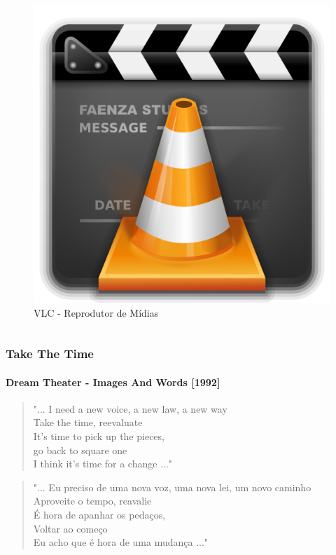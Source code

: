 \begin{frame}
\begin{columns}
	\begin{column}{4cm}
		\begin{figure}
			\includegraphics[scale=1.0]{img/vlc.png} 
			\caption{VLC - Reprodutor de Mídias}
		\end{figure}
	\end{column}
	
\end{columns}

\end{frame}

\begin{frame}\frametitle{Take The Time}\framesubtitle{Dream Theater - Images And Words [1992]}

\begin{quote}
"... I need a new {\Large voice}, a new {\Large law}, a {\LARGE new way}\\
Take the time, reevaluate\\
It's time to {\LARGE pick up the pieces},\\
go back to {\large square one}\\
I think it's {\huge time for a change} ..."
\end{quote}

\begin{quote}
"... Eu preciso de uma nova voz, uma nova lei, um novo caminho\\
Aproveite o tempo, reavalie\\
É hora de apanhar os pedaços,\\
Voltar ao começo\\
Eu acho que é hora de uma mudança ..."
\end{quote}

\end{frame}

